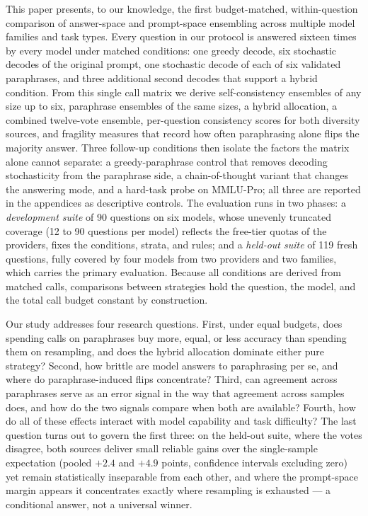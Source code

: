 This paper presents, to our knowledge, the first budget-matched, within-question comparison of answer-space and prompt-space ensembling across multiple model families and task types. Every question in our protocol is answered sixteen times by every model under matched conditions: one greedy decode, six stochastic decodes of the original prompt, one stochastic decode of each of six validated paraphrases, and three additional second decodes that support a hybrid condition. From this single call matrix we derive self-consistency ensembles of any size up to six, paraphrase ensembles of the same sizes, a hybrid allocation, a combined twelve-vote ensemble, per-question consistency scores for both diversity sources, and fragility measures that record how often paraphrasing alone flips the majority answer. Three follow-up conditions then isolate the factors the matrix alone cannot separate: a greedy-paraphrase control that removes decoding stochasticity from the paraphrase side, a chain-of-thought variant that changes the answering mode, and a hard-task probe on MMLU-Pro; all three are reported in the appendices as descriptive controls. The evaluation runs in two phases: a \emph{development suite} of 90 questions on six models, whose unevenly truncated coverage (12 to 90 questions per model) reflects the free-tier quotas of the providers, fixes the conditions, strata, and rules; and a \emph{held-out suite} of 119 fresh questions, fully covered by four models from two providers and two families, which carries the primary evaluation. Because all conditions are derived from matched calls, comparisons between strategies hold the question, the model, and the total call budget constant by construction.

Our study addresses four research questions. First, under equal budgets, does spending calls on paraphrases buy more, equal, or less accuracy than spending them on resampling, and does the hybrid allocation dominate either pure strategy? Second, how brittle are model answers to paraphrasing per se, and where do paraphrase-induced flips concentrate? Third, can agreement across paraphrases serve as an error signal in the way that agreement across samples does, and how do the two signals compare when both are available? Fourth, how do all of these effects interact with model capability and task difficulty? The last question turns out to govern the first three: on the held-out suite, where the votes disagree, both sources deliver small reliable gains over the single-sample expectation (pooled $+2.4$ and $+4.9$ points, confidence intervals excluding zero) yet remain statistically inseparable from each other, and where the prompt-space margin appears it concentrates exactly where resampling is exhausted --- a conditional answer, not a universal winner.

